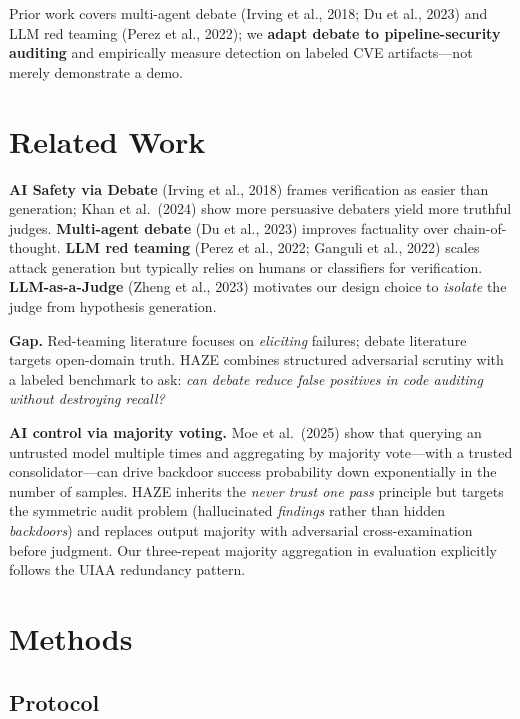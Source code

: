 \documentclass[10pt]{article}
\begin{document}
Prior work covers multi-agent debate (Irving et al., 2018; Du et al., 2023) and LLM red
teaming (Perez et al., 2022); we \textbf{adapt debate to pipeline-security auditing} and
empirically measure detection on labeled CVE artifacts---not merely demonstrate a demo.

\section{Related Work}

\textbf{AI Safety via Debate} (Irving et al., 2018) frames verification as easier than
generation; Khan et al.\ (2024) show more persuasive debaters yield more truthful judges.
\textbf{Multi-agent debate} (Du et al., 2023) improves factuality over chain-of-thought.
\textbf{LLM red teaming} (Perez et al., 2022; Ganguli et al., 2022) scales attack
generation but typically relies on humans or classifiers for verification.
\textbf{LLM-as-a-Judge} (Zheng et al., 2023) motivates our design choice to \textit{isolate}
the judge from hypothesis generation.

\textbf{Gap.} Red-teaming literature focuses on \textit{eliciting} failures; debate
literature targets open-domain truth. HAZE combines structured adversarial scrutiny with
a labeled benchmark to ask: \textit{can debate reduce false positives in code auditing
without destroying recall?}

\textbf{AI control via majority voting.} Moe et al.\ (2025) show that querying an
untrusted model multiple times and aggregating by majority vote---with a trusted
consolidator---can drive backdoor success probability down exponentially in the number of
samples. HAZE inherits the \textit{never trust one pass} principle but targets the
symmetric audit problem (hallucinated \textit{findings} rather than hidden
\textit{backdoors}) and replaces output majority with adversarial cross-examination before
judgment. Our three-repeat majority aggregation in evaluation explicitly follows the UIAA
redundancy pattern.

\section{Methods}

\subsection{Protocol}
\end{document}
